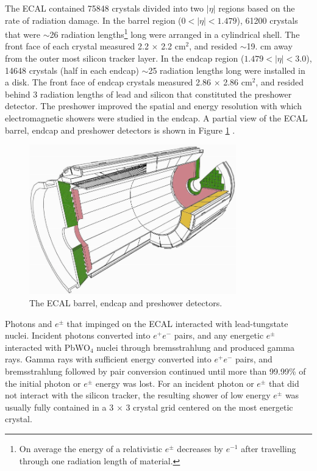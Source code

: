 The ECAL contained 75848 crystals divided into two $|\eta|$ regions based on the rate of radiation 
damage.  In the barrel region ($0 < |\eta| < 1.479$), 61200 
crystals that were $\sim$26 radiation lengths\footnote{On average the energy of a relativistic $e^{\pm}$ decreases by $e^{-1}$ after 
travelling through one radiation length of material.} long were arranged in a cylindrical shell.  The front face of 
each crystal measured 2.2 $\times$ 2.2 cm$^{2}$, and resided $\sim$19. cm away from the outer most silicon tracker layer.  
In the endcap region ($1.479 < |\eta| < 3.0$), 14648 crystals (half in each 
endcap) $\sim$25 radiation lengths long were installed in a disk.  The front face of endcap crystals measured 2.86 
$\times$ 2.86 cm$^{2}$, and resided behind 3 radiation lengths of lead and silicon that constituted the preshower detector.  
The preshower improved the spatial and energy resolution with 
which electromagnetic showers were studied in the endcap.  A partial view of the ECAL barrel, endcap and 
preshower detectors is shown in Figure \ref{fig:ecalEBEEandES} \cite{ecalTDR}.

\begin{figure}[ht]
	\centering
	\includegraphics[width=0.8\textwidth]{figures/ecalBarrelEndcapAndPreshower.png}
	\caption{The ECAL barrel, endcap and preshower detectors.}
	\label{fig:ecalEBEEandES}
\end{figure}

Photons and $e^{\pm}$ that impinged on the ECAL interacted with lead-tungstate nuclei.  Incident photons 
converted into $e^{+}e^{-}$ pairs, and any energetic $e^{\pm}$ interacted with PbWO$_{4}$ nuclei through 
bremsstrahlung and produced gamma rays.  Gamma rays with sufficient energy converted into $e^{+}e^{-}$ pairs, 
and bremsstrahlung followed by pair conversion continued until more than 99.99\% of the initial photon or 
$e^{\pm}$ energy was lost.  For an incident photon or $e^{\pm}$ that did not interact with the silicon 
tracker, the resulting shower of low energy $e^{\pm}$ was usually fully contained in a 3 $\times$ 3 crystal 
grid centered on the most energetic crystal.

